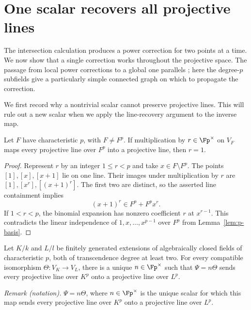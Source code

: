 \section{One scalar recovers all projective lines}\label{sec:lines}

The intersection calculation produces a power correction for two points at
a time.  We now show that a single correction works throughout the
projective space.  The passage from local power corrections to a global
one parallels \citet[Section~3.5]{CadoretPirutka2021}; here the degree-$p$
subfields give a particularly simple connected graph on which to propagate
the correction.

We first record why a nontrivial scalar cannot preserve projective lines.
This will rule out a new scalar when we apply the line-recovery argument
to the inverse map.

\begin{lemma}\label{lem:scalar-line}
Let $F$ have characteristic $p$, with $F\ne F^p$.  If multiplication by
$r\in\Fp^\times$ on $V_F$ maps every projective line over $F^p$ into a
projective line, then $r=1$.
\end{lemma}
\begin{proof}
Represent $r$ by an integer $1\le r<p$ and take $x\in F\setminus F^p$.
The points $[1],[x],[x+1]$ lie on one line.  Their images under
multiplication by $r$ are $[1],[x^r],[(x+1)^r]$.  The first two are
distinct, so the asserted line containment implies
\[
 (x+1)^r\in F^p+F^p x^r.
\]
If $1<r<p$, the binomial expansion has nonzero coefficient $r$ at
$x^{r-1}$.  This contradicts the linear independence of
$1,x,\ldots,x^{p-1}$ over $F^p$ from Lemma~\ref{lem:p-basis}.
\end{proof}

\begin{proposition}\label{prop:lines}
Let $K/k$ and $L/l$ be finitely generated extensions of algebraically
closed fields of characteristic $p$, both of transcendence degree at
least two.  For every compatible isomorphism $\Theta:V_K\to V_L$, there
is a unique $n\in\Fp^\times$ such that $\Psi=n\Theta$ sends every
projective line over $K^p$ onto a projective line over $L^p$.
\end{proposition}

\noindent\textit{Remark (notation).} $\Psi=n\Theta$, where $n\in\Fp^\times$ is the unique scalar for which this map sends every projective line over $K^p$ onto a projective line over $L^p$.


